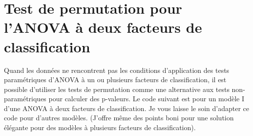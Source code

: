 \documentclass[12pt,]{book}
\begin{document}
\hypertarget{test-de-permutation-pour-lanova-uxe0-deux-facteurs-de-classification}{%
\section{Test de permutation pour l'ANOVA à deux facteurs de classification}\label{test-de-permutation-pour-lanova-uxe0-deux-facteurs-de-classification}}

Quand les données ne rencontrent pas les conditions d'application des tests paramétriques d'ANOVA à un ou plusieurs facteurs de classification, il est possible d'utiliser les tests de permutation comme une alternative aux tests non-paramétriques pour calculer des p-valeurs. Le code suivant est pour un modèle I d'une ANOVA à deux facteurs de classification. Je vous laisse le soin d'adapter ce code pour d'autres modèles. (J'offre même des points boni pour une solution élégante pour des modèles à plusieurs facteurs de classification).
\end{document}
